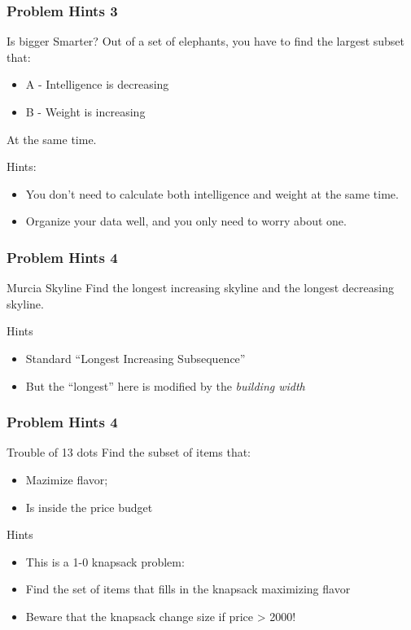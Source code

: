 \begin{frame}
  \frametitle{Problem Hints 3}

  \begin{block}{Is bigger Smarter?}
    Out of a set of elephants, you have to find the largest subset that:
    \begin{itemize}
    \item A - Intelligence is decreasing
    \item B - Weight is increasing
    \end{itemize}
    At the same time.
  \end{block}

  \bigskip

  Hints:
  \begin{itemize}
  \item You don't need to calculate both intelligence and weight at
    the same time.
  \item Organize your data well, and you only need to worry about one.
  \end{itemize}
\end{frame}

\begin{frame}
  \frametitle{Problem Hints 4}
  \begin{block}{Murcia Skyline}
    Find the longest increasing skyline and the longest decreasing skyline.
  \end{block}

  \bigskip

  Hints
  \begin{itemize}
  \item Standard ``Longest Increasing Subsequence''
  \item But the ``longest'' here is modified by the \emph{building width}
  \end{itemize}
\end{frame}

\begin{frame}
  \frametitle{Problem Hints 4}
  \begin{block}{Trouble of 13 dots}
    Find the subset of items that:
    \begin{itemize}
    \item Mazimize flavor;
    \item Is inside the price budget
    \end{itemize}
  \end{block}

  \bigskip

  Hints
  \begin{itemize}
  \item This is a 1-0 knapsack problem:
  \item Find the set of items that fills in the knapsack maximizing flavor
  \item Beware that \alert{the knapsack change size if price > 2000!}
  \end{itemize}
\end{frame}

